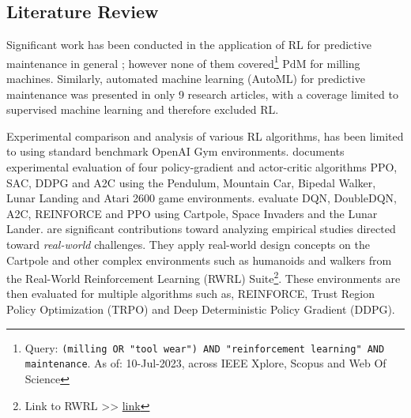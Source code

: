 \documentclass[a4paper, 12pt]{article}
\begin{document}
\subsection{Literature Review}
Significant work has been conducted in the application of RL for predictive maintenance in general \citep{Panzer2021, Erhan2021, siraskar2023}; however none of them covered\footnote{Query: \texttt{(milling OR "tool wear") AND "reinforcement learning" AND maintenance}. As of: 10-Jul-2023, across IEEE Xplore\texttrademark{}, Scopus\texttrademark{} and Web Of Science\texttrademark{}} PdM for milling machines. %
Similarly, automated machine learning (AutoML) for predictive maintenance was presented in only 9 research articles, with a coverage limited to supervised machine learning and therefore excluded RL. %


Experimental comparison and analysis of various RL algorithms, has been limited to using standard benchmark OpenAI Gym environments. \cite{sandeep2022experimental} documents experimental evaluation of four policy-gradient and actor-critic algorithms PPO, SAC, DDPG and A2C using the Pendulum, Mountain Car, Bipedal Walker, Lunar Landing and Atari 2600 game environments. \cite{Krishna2020} evaluate DQN, DoubleDQN, A2C, REINFORCE and PPO using Cartpole, Space Invaders and the Lunar Lander. \cite{dulac2021, dulac2020empirical} are significant contributions toward analyzing empirical studies directed toward \textit{real-world} challenges. They apply real-world design concepts on the Cartpole and other complex environments such as humanoids and walkers from the Real-World Reinforcement Learning (RWRL) Suite\footnote{Link to RWRL >> \href{https://github.com/google-research/realworldrl_suite}{link}}. These environments are then evaluated for multiple algorithms such as, REINFORCE, Trust Region Policy Optimization (TRPO) and Deep Deterministic Policy Gradient (DDPG). 
\end{document}
